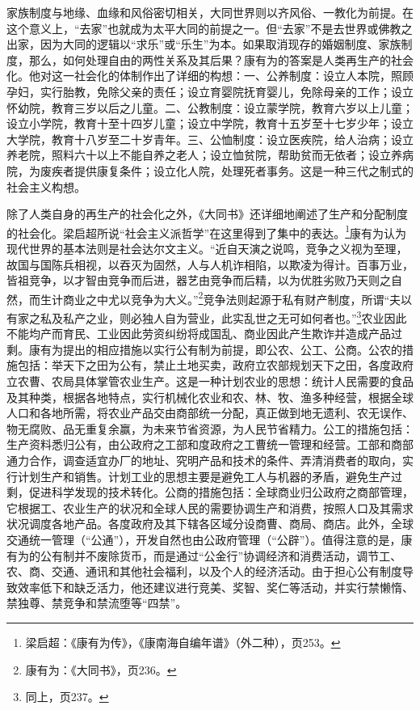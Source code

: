 \documentclass[a4paper, 12pt, openright]{ctexbook}
\begin{document}
家族制度与地缘、血缘和风俗密切相关，大同世界则以齐风俗、一教化为前提。在这个意义上，“去家”也就成为太平大同的前提之一。但“去家”不是去世界或佛教之出家，因为大同的逻辑以“求乐”或“乐生”为本。如果取消现存的婚姻制度、家族制度，那么，如何处理自由的两性关系及其后果？康有为的答案是人类再生产的社会化。他对这一社会化的体制作出了详细的构想：一、公养制度：设立人本院，照顾孕妇，实行胎教，免除父亲的责任；设立育婴院抚育婴儿，免除母亲的工作；设立怀幼院，教育三岁以后之儿童。二、公教制度：设立蒙学院，教育六岁以上儿童；设立小学院，教育十至十四岁儿童；设立中学院，教育十五岁至十七岁少年；设立大学院，教育十八岁至二十岁青年。三、公恤制度：设立医疾院，给人治病；设立养老院，照料六十以上不能自养之老人；设立恤贫院，帮助贫而无依者；设立养病院，为废疾者提供康复条件；设立化人院，处理死者事务。这是一种三代之制式的社会主义构想。

除了人类自身的再生产的社会化之外，《大同书》还详细地阐述了生产和分配制度的社会化。梁启超所说“社会主义派哲学”在这里得到了集中的表达。\footnote{梁启超：《康有为传》，《康南海自编年谱》（外二种），页253。}康有为认为现代世界的基本法则是社会达尔文主义。“近自天演之说鸣，竞争之义视为至理，故国与国陈兵相视，以吞灭为固然，人与人机诈相陷，以欺凌为得计。百事万业，皆祖竞争，以才智由竞争而后进，器艺由竞争而后精，以为优胜劣败乃天则之自然，而生计商业之中尤以竞争为大义。”\footnote{康有为：《大同书》，页236。}竞争法则起源于私有财产制度，所谓“夫以有家之私及私产之业，则必独人自为营业，此实乱世之无可如何者也。”\footnote{同上，页237。}农业因此不能均产而育民、工业因此劳资纠纷将成国乱、商业因此产生欺诈并造成产品过剩。康有为提出的相应措施以实行公有制为前提，即公农、公工、公商。公农的措施包括：举天下之田为公有，禁止土地买卖，政府立农部规划天下之田，各度政府立农曹、农局具体掌管农业生产。这是一种计划农业的思想：统计人民需要的食品及其种类，根据各地特点，实行机械化农业和农、林、牧、渔多种经营，根据全球人口和各地所需，将农业产品交由商部统一分配，真正做到地无遗利、农无误作、物无腐败、品无重复余赢，为未来节省资源，为人民节省精力。公工的措施包括：生产资料悉归公有，由公政府之工部和度政府之工曹统一管理和经营。工部和商部通力合作，调查适宜办厂的地址、究明产品和技术的条件、弄清消费者的取向，实行计划生产和销售。计划工业的思想主要是避免工人与机器的矛盾，避免生产过剩，促进科学发现的技术转化。公商的措施包括：全球商业归公政府之商部管理，它根据工、农业生产的状况和全球人民的需要协调生产和消费，按照人口及其需求状况调度各地产品。各度政府及其下辖各区域分设商曹、商局、商店。此外，全球交通统一管理（“公通”），开发自然也由公政府管理（“公辟”）。值得注意的是，康有为的公有制并不废除货币，而是通过“公金行”协调经济和消费活动，调节工、农、商、交通、通讯和其他社会福利，以及个人的经济活动。由于担心公有制度导致效率低下和缺乏活力，他还建议进行竞美、奖智、奖仁等活动，并实行禁懒惰、禁独尊、禁竞争和禁流堕等“四禁”。
\end{document}
